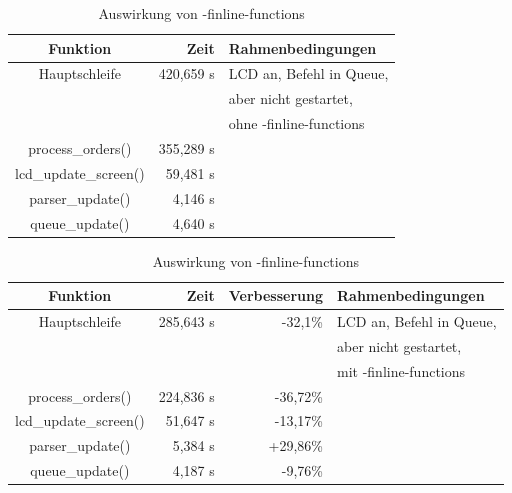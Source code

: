 \begin{table}[htb]
\begin{center}
	\begin{tabularx}{\textwidth}{|c||r|X|}
		\hline
		\textbf{Funktion} & \textbf{Zeit} & \textbf{Rahmenbedingungen} \\ \hline \hline
		Hauptschleife & 420,659 \textmu{}s & LCD an, Befehl in Queue,\\
		& & aber nicht gestartet, \\
		& & ohne -finline-functions \\ \hline
		process\_orders() & 355,289 \textmu{}s &  \\ \hline
		lcd\_update\_screen() & 59,481 \textmu{}s & \\ \hline
		parser\_update() & 4,146 \textmu{}s & \\ \hline
		queue\_update() & 4,640 \textmu{}s & \\ \hline \hline
	\end{tabularx}
	\begin{tabularx}{\textwidth}{|c||r|r|X|}
		\hline
		\textbf{Funktion} & \textbf{Zeit} & \textbf{Verbesserung} & \textbf{Rahmenbedingungen} \\ \hline \hline
		Hauptschleife & 285,643 \textmu{}s & -32,1\% & LCD an, Befehl in Queue,\\
		& & & aber nicht gestartet, \\
		& & & mit -finline-functions \\ \hline
		process\_orders() & 224,836 \textmu{}s & -36,72\% & \\ \hline
		lcd\_update\_screen() & 51,647 \textmu{}s & -13,17\% & \\ \hline
		parser\_update() & 5,384 \textmu{}s & +29,86\% & \\ \hline
		queue\_update() & 4,187 \textmu{}s & -9,76\% & \\ \hline
	\end{tabularx}
	\caption{\label{compiler_flags_2} Auswirkung von -finline-functions}
\end{center}
\end{table}

